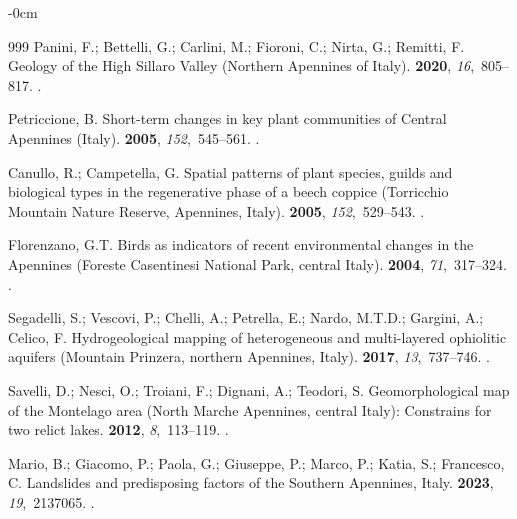 \documentclass[jimaging,article,accept,pdftex,oneauthor]{Definitions/mdpi}
\begin{document}
\begin{adjustwidth}{-\extralength}{0cm}
\begin{thebibliography}{999}
Panini, F.; Bettelli, G.; Carlini, M.; Fioroni, C.; Nirta, G.; Remitti, F.
\newblock Geology of the High Sillaro Valley (Northern Apennines of Italy).
 {\bf 2020}, {\em 16},~805--817.
.

Petriccione, B.
\newblock Short-term changes in key plant communities of Central Apennines
  (Italy).
 {\bf 2005}, {\em 152},~545--561.
.

Canullo, R.; Campetella, G.
\newblock Spatial patterns of plant species, guilds and biological types in the
  regenerative phase of a beech coppice (Torricchio Mountain Nature Reserve,
  Apennines, Italy).
 {\bf 2005}, {\em 152},~529--543.
.

Florenzano, G.T.
\newblock Birds as indicators of recent environmental changes in the Apennines
  (Foreste Casentinesi National Park, central Italy).
 {\bf 2004}, {\em 71},~317--324.
.

Segadelli, S.; Vescovi, P.; Chelli, A.; Petrella, E.; Nardo, M.T.D.; Gargini,
  A.; Celico, F.
\newblock Hydrogeological mapping of heterogeneous and multi-layered ophiolitic
  aquifers (Mountain Prinzera, northern Apennines, Italy).
 {\bf 2017}, {\em 13},~737--746.
.

Savelli, D.; Nesci, O.; Troiani, F.; Dignani, A.; Teodori, S.
\newblock Geomorphological map of the Montelago area (North Marche Apennines,
  central Italy): Constrains for two relict lakes.
 {\bf 2012}, {\em 8},~113--119.
.

Mario, B.; Giacomo, P.; Paola, G.; Giuseppe, P.; Marco, P.; Katia, S.; Francesco,
  C.
\newblock Landslides and predisposing factors of the Southern Apennines, Italy.
 {\bf 2023}, {\em 19},~2137065.
.


\end{thebibliography}
\end{adjustwidth}
\end{document}
